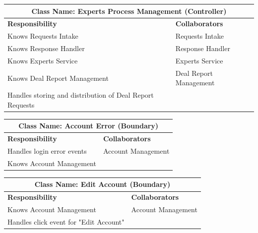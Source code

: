 \documentclass[]{article}
\begin{document}
\begin{itemize}
        \begin{table}[H]
        \centering
        \renewcommand{\arraystretch}{1.3} %
        \begin{tabular}{|p{6cm}|p{6cm}|} 
        \hline
        \multicolumn{2}{|c|}{\textbf{Class Name: Experts Process Management (Controller)}} \\ 
        \hline
        \textbf{Responsibility} & \textbf{Collaborators} \\ 
        \hline
        Knows Requests Intake & Requests Intake \\
        Knows Response Handler & Response Handler \\
        Knows Experts Service & Experts Service \\
        Knows Deal Report Management & Deal Report Management \\
        Handles storing and distribution of Deal Report Requests & \\
        \hline
        \end{tabular}
        \label{tab:crc_card}
        \end{table}

        \begin{table}[H]
        \centering
        \renewcommand{\arraystretch}{1.3} %
        \begin{tabular}{|p{6cm}|p{6cm}|} 
        \hline
        \multicolumn{2}{|c|}{\textbf{Class Name: Account Error (Boundary)}} \\ 
        \hline
        \textbf{Responsibility} & \textbf{Collaborators} \\ 
        \hline
        Handles login error events & Account Management \\
        Knows Account Management& \\
        \hline
        \end{tabular}
        \label{tab:crc_card}
        \end{table}

        \begin{table}[H]
        \centering
        \renewcommand{\arraystretch}{1.3} %
        \begin{tabular}{|p{6cm}|p{6cm}|} 
        \hline
        \multicolumn{2}{|c|}{\textbf{Class Name: Edit Account (Boundary)}} \\ 
        \hline
        \textbf{Responsibility} & \textbf{Collaborators} \\ 
        \hline
        Knows Account Management& Account Management \\
        Handles click event for "Edit Account" & \\
        \hline
        \end{tabular}
        \label{tab:crc_card}
        \end{table}
\end{itemize}
\end{document}
